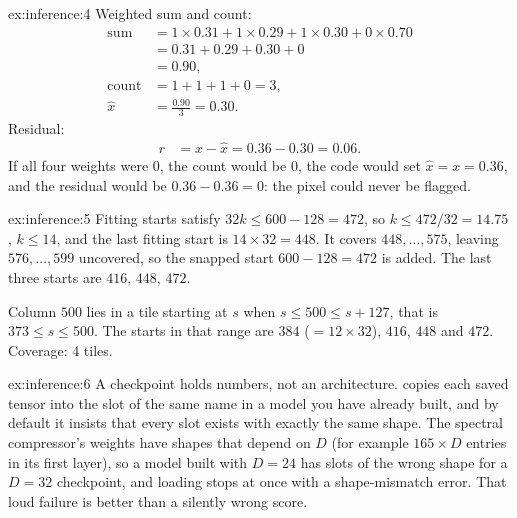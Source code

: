 \begin{solution}{ex:inference:4}
Weighted sum and count:
\begin{align*}
\text{sum} &= 1\times0.31 + 1\times0.29 + 1\times0.30 + 0\times0.70\\
&= 0.31+0.29+0.30+0\\
&= 0.90,\\
\text{count} &= 1+1+1+0 = 3,\\
\hat{x} &= \frac{0.90}{3} = 0.30.
\end{align*}
Residual:
\begin{align*}
r &= x-\hat{x} = 0.36-0.30 = 0.06.
\end{align*}
If all four weights were $0$, the count would be $0$, the code would set $\hat{x}=x=0.36$, and the residual
would be $0.36-0.36=0$: the pixel could never be flagged.
\end{solution}

\begin{solution}{ex:inference:5}
Fitting starts satisfy $32k\le600-128=472$, so $k\le472/32=14.75$, $k\le14$, and the last fitting start is
$14\times32=448$. It covers $448,\dots,575$, leaving $576,\dots,599$ uncovered, so the snapped start
$600-128=472$ is added. The last three starts are $416$, $448$, $472$.

Column $500$ lies in a tile starting at $s$ when $s\le500\le s+127$, that is $373\le s\le500$. The starts in
that range are $384$ ($=12\times32$), $416$, $448$ and $472$. Coverage: 4 tiles.
\end{solution}

\begin{solution}{ex:inference:6}
A checkpoint holds numbers, not an architecture.  copies each saved tensor into the
slot of the same name in a model you have already built, and by default it insists that every slot exists
with exactly the same shape. The spectral compressor's weights have shapes that depend on $D$ (for example
$165\times D$ entries in its first layer), so a model built with $D=24$ has slots of the wrong shape for a
$D=32$ checkpoint, and loading stops at once with a shape-mismatch error. That loud failure is better than
a silently wrong score.
\end{solution}
